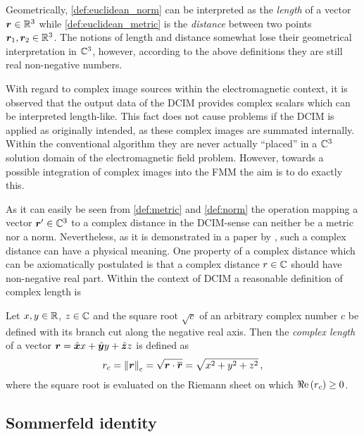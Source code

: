 Geometrically, \cref{def:euclidean_norm} can be interpreted as the \emph{length}
of a vector $\pvec{r} \in \R^3$ while \cref{def:euclidean_metric} is the
\emph{distance} between two points $\pvec{r}_1, \pvec{r}_2 \in \R^3$.
The notions of length and distance somewhat lose their geometrical
interpretation in $\mathbb{C}^3$, however, according to the above definitions they
are still real non-negative numbers.

With regard to complex image sources within the electromagnetic context, it is
observed that the output data of the \ac{DCIM} provides complex scalars
which can be interpreted length-like.
This fact does not cause problems if the \ac{DCIM} is applied as originally
intended, as these complex images are summated internally. Within the 
conventional algorithm they are never actually \enquote{placed} in a 
$\mathbb{C}^3$ solution domain of the electromagnetic field problem.
However, towards a possible integration of complex images into the \ac{FMM} the
aim is to do exactly this.

As it can easily be seen from \cref{def:metric} and \cref{def:norm}
the operation mapping a vector $\rsrc \in \C^3$ to a complex distance in the
\acs{DCIM}-sense can neither be a metric nor a norm.
Nevertheless, as it is demonstrated in a paper by \textcite{Hansen2009}, such a
complex distance can have a physical meaning.
One property of a complex distance which can be axiomatically postulated
is that a complex distance $r \in \mathbb{C}$ should have non-negative real part.
Within the context of \ac{DCIM} a reasonable definition of complex length
is \cite{Hansen2009, Hansen2013}
\begin{definition}
	Let $x, y \in \mathbb{R}$, $z \in \mathbb{C}$ and the square root $\sqrt{c}$ of
	an arbitrary complex number $c$ be defined with its branch cut along the
	negative real axis.
	Then the \emph{complex length} of a vector
	$\pvec{r} = \uv{x}x + \uv{y}y +\uv{z}z$ is defined as
	\begin{equation}
		r_c =
		\complexLength{\pvec{r}} =
		\sqrt{\pvec{r} \cdot \overline{\pvec{r}}} =
		\sqrt{x^2 + y^2 + z^2} \, ,
	\end{equation}
	where the square root is evaluated on the Riemann sheet on which 
	$\Re\mathrm{e}\left(r_c\right) \ge 0$.
\end{definition}





\subsection{Sommerfeld identity}



